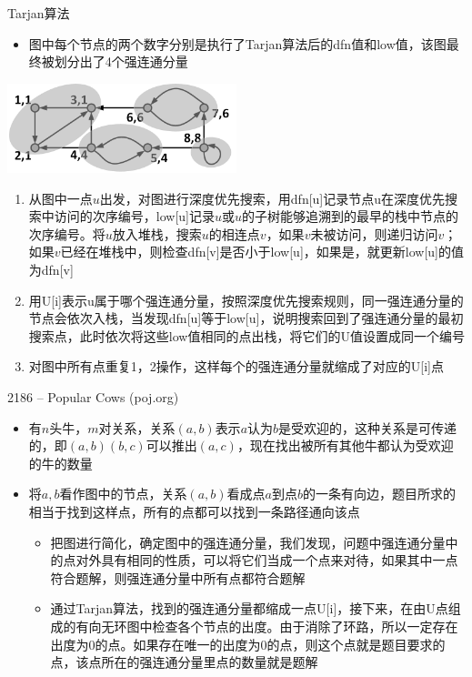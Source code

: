 \begin{frame}{Tarjan算法}
    \begin{itemize}
        \item 图中每个节点的两个数字分别是执行了Tarjan算法后的dfn值和low值，该图最终被划分出了4个强连通分量
    \end{itemize}
    \vfill
    \includegraphics[width=0.5\textwidth,center]{fig/8-6.png}
    \scriptsize{
    \begin{enumerate}[(1)]
        \item 从图中一点$u$出发，对图进行深度优先搜索，用dfn[u]记录节点u在深度优先搜索中访问的次序编号，low[u]记录$u$或$u$的子树能够追溯到的最早的栈中节点的次序编号。将$u$放入堆栈，搜索$u$的相连点$v$，如果$v$未被访问，则递归访问$v$；如果$v$已经在堆栈中，则检查dfn[v]是否小于low[u]，如果是，就更新low[u]的值为dfn[v]
        \item 用U[i]表示u属于哪个强连通分量，按照深度优先搜索规则，同一强连通分量的节点会依次入栈，当发现dfn[u]等于low[u]，说明搜索回到了强连通分量的最初搜索点，此时依次将这些low值相同的点出栈，将它们的U值设置成同一个编号
        \item 对图中所有点重复1，2操作，这样每个的强连通分量就缩成了对应的U[i]点
    \end{enumerate}}
\end{frame}
\begin{frame}{2186 -- Popular Cows (poj.org)}
    \begin{itemize}
        \item 有$n$头牛，$m$对关系，关系$(a,b)$表示$a$认为$b$是受欢迎的，这种关系是可传递的，即$(a,b)(b,c)$可以推出$(a,c)$，现在找出被所有其他牛都认为受欢迎的牛的数量
        \item 将$a,b$看作图中的节点，关系$(a,b)$看成点$a$到点$b$的一条有向边，题目所求的相当于找到这样点，所有的点都可以找到一条路径通向该点
        \begin{itemize}
            \item 把图进行简化，确定图中的强连通分量，我们发现，问题中强连通分量中的点对外具有相同的性质，可以将它们当成一个点来对待，如果其中一点符合题解，则强连通分量中所有点都符合题解
            \item 通过Tarjan算法，找到的强连通分量都缩成一点U[i]，接下来，在由U点组成的有向无环图中检查各个节点的出度。由于消除了环路，所以一定存在出度为0的点。如果存在唯一的出度为0的点，则这个点就是题目要求的点，该点所在的强连通分量里点的数量就是题解
        \end{itemize}
    \end{itemize}
\end{frame}
